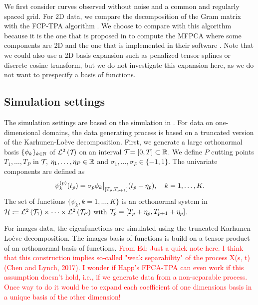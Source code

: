 We first consider curves observed without noise and a common and regularly spaced grid. For 2D data, we compare the decomposition of the Gram matrix with the FCP-TPA algorithm \cite{allenMultiwayFunctionalPrincipal2013a}. We choose to compare with this algorithm because it is the one that is proposed in \cite{happMultivariateFunctionalPrincipal2015} to compute the MFPCA where some components are 2D and the one that is implemented in their software \citep{happ-kurzObjectOrientedSoftwareFunctional2020}. Note that we could also use a 2D basis expansion such as penalized tensor splines or discrete cosine transform, but we do not investigate this expansion here, as we do not want to prespecify a basis of functions.

\subsection{Simulation settings} %
\label{sub:simulation_settings}

The simulation settings are based on the simulation in \cite{happMultivariateFunctionalPrincipal2015}. For data on one-dimensional domains, the data generating process is based on a truncated version of the Karhunen-Loève decomposition. First, we generate a large orthonormal basis $\{\phi_k\}_{k \in \mathbb{N}}$ of $\mathcal{L}^{2}\left(\mathcal{T}_{}\right)$ on an interval $\mathcal{T}_{} = [0, T] \subset \mathbb{R}$. We define $P$ cutting points $T_1, \dots, T_P$ in $\mathcal{T}_{}$, $\eta_1, \dots, \eta_P \in \mathbb{R}$ and $\sigma_1, \dots, \sigma_P \in \{-1, 1\}$. The univariate components are defined as
\begin{equation}\label{eq:simulation_uni_component}
    \psi_k^{(p)}(t_p) = \sigma_p \restr{\phi_k}{[T_p, T_{p + 1}]}(t_p - \eta_p), \quad k = 1, \dots, K.
\end{equation}
The set of functions $\{\psi_k, k = 1, \dots, K\}$ is an orthonormal system in $\mathcal{H} \coloneqq \mathcal{L}^{2}\left(\mathcal{T}_{1}\right) \times \dots \times \mathcal{L}^{2}\left(\mathcal{T}_{P}\right)$ with $\mathcal{T}_{p} = [T_p + \eta_p, T_{p + 1} + \eta_p]$.

For images data, the eigenfunctions are simulated using the truncated Karhunen-Loève decomposition. The images basis of functions is build on a tensor product of an orthonormal basis of functions. \textcolor{red}{From Ed: Just a quick note here. I think that this construction implies so-called "weak separability" of the process X(s, t) (Chen and Lynch, 2017). I wonder if Happ's FPCA-TPA can even work if this assumption doesn't hold, i.e., if we generate data from a non-separable process. Once way to do it would be to expand each coefficient of one dimensions basis in a unique basis of the other dimension!}

